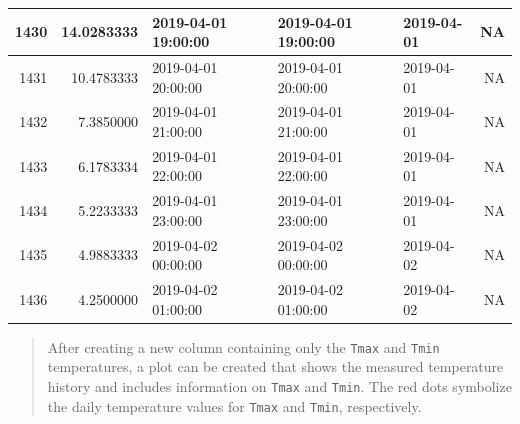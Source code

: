 \documentclass[
]{book}
\newenvironment{Shaded}{\begin{snugshade}}{\end{snugshade}}
\newcommand{\DataTypeTok}[1]{\textcolor[rgb]{0.13,0.29,0.53}{#1}}
\newcommand{\DecValTok}[1]{\textcolor[rgb]{0.00,0.00,0.81}{#1}}
\newcommand{\FloatTok}[1]{\textcolor[rgb]{0.00,0.00,0.81}{#1}}
\newcommand{\KeywordTok}[1]{\textcolor[rgb]{0.13,0.29,0.53}{\textbf{#1}}}
\newcommand{\NormalTok}[1]{#1}
\newcommand{\OperatorTok}[1]{\textcolor[rgb]{0.81,0.36,0.00}{\textbf{#1}}}
\newcommand{\StringTok}[1]{\textcolor[rgb]{0.31,0.60,0.02}{#1}}
\begin{document}
\begin{table}
\begin{tabular}[t]{r|r|l|l|l|r}
\hline
1430 & 14.0283333 & 2019-04-01 19:00:00 & 2019-04-01 19:00:00 & 2019-04-01 & NA\\
\hline
1431 & 10.4783333 & 2019-04-01 20:00:00 & 2019-04-01 20:00:00 & 2019-04-01 & NA\\
\hline
1432 & 7.3850000 & 2019-04-01 21:00:00 & 2019-04-01 21:00:00 & 2019-04-01 & NA\\
\hline
1433 & 6.1783334 & 2019-04-01 22:00:00 & 2019-04-01 22:00:00 & 2019-04-01 & NA\\
\hline
1434 & 5.2233333 & 2019-04-01 23:00:00 & 2019-04-01 23:00:00 & 2019-04-01 & NA\\
\hline
1435 & 4.9883333 & 2019-04-02 00:00:00 & 2019-04-02 00:00:00 & 2019-04-02 & NA\\
\hline
1436 & 4.2500000 & 2019-04-02 01:00:00 & 2019-04-02 01:00:00 & 2019-04-02 & NA\\
\hline
\end{tabular}
\end{table}

\begin{quote}
After creating a new column containing only the \texttt{Tmax} and \texttt{Tmin} temperatures, a plot can be created that shows the measured temperature history and includes information on \texttt{Tmax} and \texttt{Tmin}. The red dots symbolize the daily temperature values for \texttt{Tmax} and \texttt{Tmin}, respectively.
\end{quote}

\begin{Shaded}
\end{Shaded}
\end{document}
